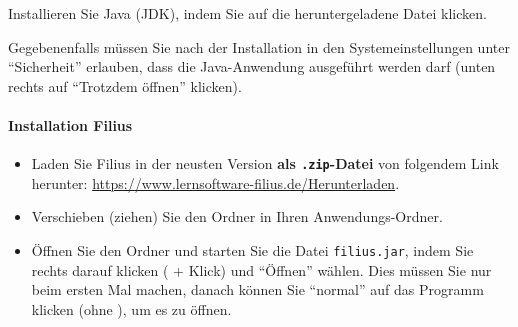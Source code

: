 Installieren Sie Java (JDK), indem Sie auf die heruntergeladene Datei klicken.

Gegebenenfalls müssen Sie nach der Installation in den Systemeinstellungen unter \enquote{Sicherheit} erlauben, dass die Java-Anwendung ausgeführt werden darf (unten rechts auf \enquote{Trotzdem öffnen} klicken).

\paragraph*{Installation Filius}

\begin{itemize}
	\item Laden Sie Filius in der neusten Version \textbf{als \texttt{.zip}-Datei} von folgendem Link herunter: \url{https://www.lernsoftware-filius.de/Herunterladen}.
	\item Verschieben (ziehen) Sie den Ordner in Ihren Anwendungs-Ordner.
	\item Öffnen Sie den Ordner und starten Sie die Datei \texttt{filius.jar}, indem Sie rechts darauf klicken (\keys{\ctrl} + Klick) und \enquote{Öffnen} wählen. Dies müssen Sie nur beim ersten Mal machen, danach können Sie \enquote{normal} auf das Programm klicken (ohne \keys{\ctrl}), um es zu öffnen.
\end{itemize}